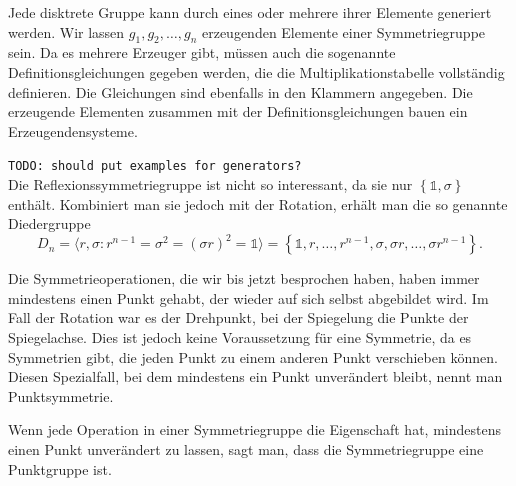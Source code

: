 \begin{definition}[Erzeugendensysteme]
	Jede disktrete Gruppe kann durch eines oder mehrere ihrer Elemente generiert
	werden.  Wir lassen \(g_1, g_2, \ldots, g_n\) erzeugenden Elemente einer
	Symmetriegruppe sein.  Da es mehrere Erzeuger gibt, müssen auch die
	sogenannte Definitionsgleichungen gegeben werden, die die
	Multiplikationstabelle vollständig definieren. Die Gleichungen sind ebenfalls
	in den Klammern angegeben. Die erzeugende Elementen zusammen mit der
	Definitionsgleichungen bauen ein Erzeugendensysteme.
\end{definition}

\texttt{TODO: should put examples for generators?} \\

Die Reflexionssymmetriegruppe ist nicht so interessant, da sie nur
\(\left\{\mathds{1}, \sigma\right\}\) enthält. Kombiniert man sie jedoch mit
der Rotation, erhält man die so genannte Diedergruppe
\[
	D_n = \langle r, \sigma : r^{n-1} = \sigma^2 = (\sigma r)^2 = \mathds{1} \rangle
		= \left\{
				\mathds{1}, r, \ldots, r^{n-1}, \sigma, \sigma r, \ldots, \sigma r^{n-1}
		\right\}.
\]

Die Symmetrieoperationen, die wir bis jetzt besprochen haben, haben immer
mindestens einen Punkt gehabt, der wieder auf sich selbst abgebildet wird. Im
Fall der Rotation war es der Drehpunkt, bei der Spiegelung die Punkte der
Spiegelachse. Dies ist jedoch keine Voraussetzung für eine Symmetrie, da es
Symmetrien gibt, die jeden Punkt zu einem anderen Punkt verschieben können.
Diesen Spezialfall, bei dem mindestens ein Punkt unverändert bleibt, nennt man
Punktsymmetrie.
\begin{definition}[Punktgruppe]
	Wenn jede Operation in einer Symmetriegruppe die Eigenschaft hat, mindestens
	einen Punkt unverändert zu lassen, sagt man, dass die Symmetriegruppe eine
	Punktgruppe ist.
\end{definition}

